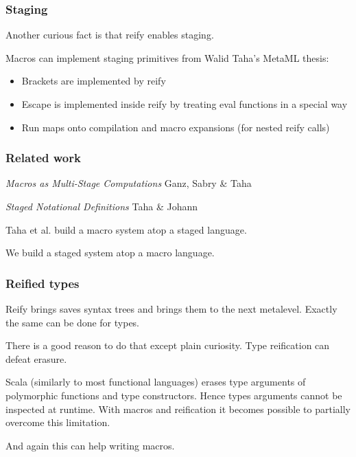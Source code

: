 \documentclass[hyperref={bookmarks=false}]{beamer}
\begin{document}
\begin{frame}[fragile]
\frametitle{Staging}

Another curious fact is that reify enables staging.

Macros can implement staging primitives from Walid Taha's MetaML thesis:
\begin{itemize}
\item Brackets are implemented by reify
\item Escape is implemented inside reify by treating eval functions in a special way
\item Run maps onto compilation and macro expansions (for nested reify calls)
\end{itemize}

\end{frame}

\begin{frame}[fragile]
\frametitle{Related work}

\emph{Macros as Multi-Stage Computations} Ganz, Sabry \& Taha

\emph{Staged Notational Definitions} Taha \& Johann

Taha et al. build a macro system atop a staged language.

We build a staged system atop a macro language.

\end{frame}

\begin{frame}[fragile]
\frametitle{Reified types}

Reify brings saves syntax trees and brings them to the next metalevel. Exactly the same can be done for types.

There is a good reason to do that except plain curiosity. Type reification can defeat erasure.

Scala (similarly to most functional languages) erases type arguments of polymorphic functions and type constructors. Hence types arguments cannot be inspected at runtime. With macros and reification it becomes possible to partially overcome this limitation.

And again this can help writing macros.

\end{frame}
\end{document}
